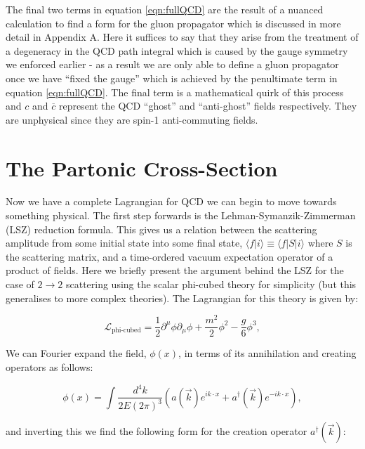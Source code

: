 	The final two terms in equation \eqref{eqn:fullQCD} are the result of a nuanced calculation to find a form
	for the gluon propagator which is discussed in more detail in Appendix A.  Here it suffices to say that they
	arise from the treatment of a degeneracy in the QCD path integral which is caused by the gauge symmetry we
	enforced earlier - as a result we are only able to define a gluon propagator once we have ``fixed the gauge'' which
	is achieved by the penultimate term in equation \eqref{eqn:fullQCD}.  The final term is a
	mathematical quirk of this process and $c$ and $\overline{c}$ represent the QCD
	``ghost'' and ``anti-ghost'' fields respectively.  They are unphysical since they are spin-1 anti-commuting fields.

\section{The Partonic Cross-Section}
	\label{sec:partonicCrossSection}

	Now we have a complete Lagrangian for QCD we can begin to move towards something physical.  The first step forwards
	is the Lehman-Symanzik-Zimmerman (LSZ) reduction formula.  This gives us a relation between the scattering amplitude
	from some initial state into some final state, $\langle f|i\rangle\equiv\langle f|S|i\rangle$ where $S$ is the
	scattering matrix, and a time-ordered vacuum expectation operator of a product of fields.  Here we briefly present
	the argument behind the LSZ for the case of $2\rightarrow2$ scattering using the scalar phi-cubed theory for simplicity
	(but this generalises to more complex theories). The Lagrangian for this theory is given by:

	\begin{equation}
		\mathcal{L}_{\text{phi-cubed}} = \frac{1}{2}\partial^{\mu}\phi\partial_{\mu}\phi + \frac{m^2}{2}\phi^2 - \frac{g}{6}\phi^3,
		\label{eqn:phi3}
	\end{equation}

	We can Fourier expand the field, $\phi(x)$, in terms of its annihilation and creating operators as follows:

	\begin{equation}
		\phi(x) = \int\frac{d^4k}{2E(2\pi)^3}\left(a(\vec{k})e^{ik\cdot x} + a^\dagger(\vec{k})e^{-ik\cdot x}\right),
	\end{equation}

	and inverting this we find the following form for the creation operator $a^\dagger(\vec{k})$:

